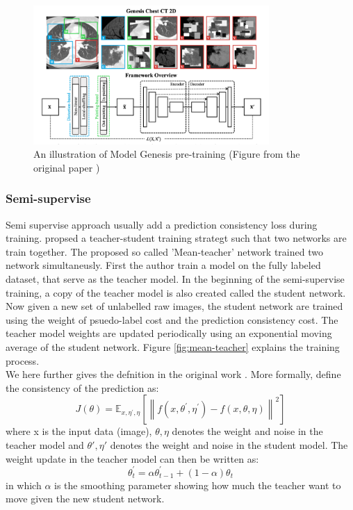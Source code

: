 \begin{figure}
	\centering
	\includegraphics[width=0.8\textwidth]{img/background_img/Genesis_illustration.png}
	\caption{An illustration of Model Genesis pre-training (Figure from the original paper \cite{zhou_models_2019})}
	\label{fig:genesis-net}
\end{figure}

\subsubsection{Semi-supervise}
Semi supervise approach usually add a prediction consistency loss during training. \cite{tarvainen_mean_2018} propsed a teacher-student training strategt such that two networks are train together. The proposed so called 'Mean-teacher' network trained two network simultaneusly. First the author train a model on the fully labeled dataset, that serve as the teacher model. In the beginning of the semi-supervise training, a copy of the teacher model is also created called the student network. Now given a new set of unlabelled raw images, the student network are trained using the weight of psuedo-label cost and the prediction consistency cost. The teacher model weights are updated periodically using an exponential moving average of the student network. Figure \ref{fig:mean-teacher} explains the training process. \\

We here further gives the defnition in the original work \cite{tarvainen_mean_2018}. More formally, define the consistency of the prediction as:
$$J(\theta)=\mathbb{E}_{x, \eta^{\prime}, \eta}\left[\left\|f\left(x, \theta^{\prime}, \eta^{\prime}\right)-f(x, \theta, \eta)\right\|^{2}\right]$$
where x is the input data (image), $\theta, \eta$ denotes the weight and noise in the teacher model and $\theta', \eta'$ denotes the weight and noise in the student model.
The weight update in the teacher model can then be written as:
$$\theta_{t}^{\prime}=\alpha \theta_{t-1}^{\prime}+(1-\alpha) \theta_{t}$$ in which $\alpha$ is the smoothing parameter showing how much the teacher want to move given the new student network.\\

